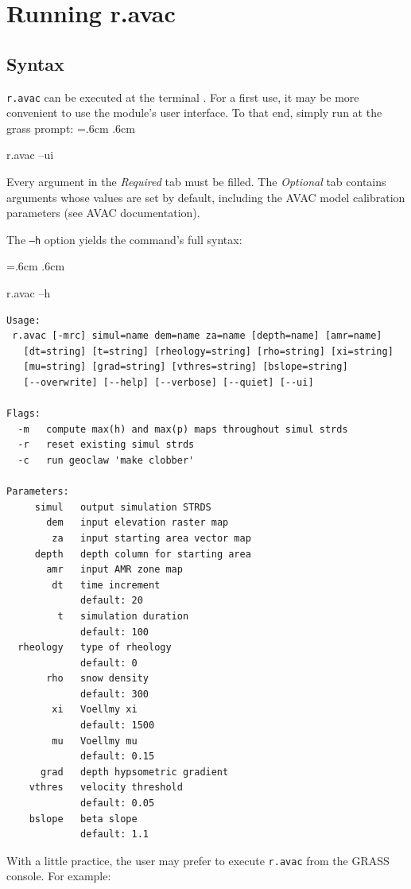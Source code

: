 \documentclass[12pt,oneside]{paper}
\newenvironment{code}{%
\vspace{2mm}%
\hangindent=.6cm%
\parindent.6cm%
\ttfamily%
\color{gris.3}%
}{
\vspace{2mm}%
}
\begin{document}
\section{Running r.avac}

\subsection{Syntax}

\verb+r.avac+ can be executed at the terminal . For a first use, it may be more convenient to use the module's user interface. To that end, simply run at the grass prompt:
\begin{code}
r.avac --ui
\end{code}

Every argument in the \emph{Required} tab must be filled. The \emph{Optional} tab contains arguments whose values are set by default, including the AVAC model calibration parameters (see AVAC documentation).


The \texttt{--h} option yields the command's full syntax:

\begin{code}
r.avac --h
\begin{Verbatim}
Usage:
 r.avac [-mrc] simul=name dem=name za=name [depth=name] [amr=name]
   [dt=string] [t=string] [rheology=string] [rho=string] [xi=string]
   [mu=string] [grad=string] [vthres=string] [bslope=string]
   [--overwrite] [--help] [--verbose] [--quiet] [--ui]

Flags:
  -m   compute max(h) and max(p) maps throughout simul strds
  -r   reset existing simul strds
  -c   run geoclaw 'make clobber'

Parameters:
     simul   output simulation STRDS
       dem   input elevation raster map
        za   input starting area vector map
     depth   depth column for starting area
       amr   input AMR zone map
        dt   time increment
             default: 20
         t   simulation duration
             default: 100
  rheology   type of rheology
             default: 0
       rho   snow density
             default: 300
        xi   Voellmy xi
             default: 1500
        mu   Voellmy mu
             default: 0.15
      grad   depth hypsometric gradient
    vthres   velocity threshold
             default: 0.05
    bslope   beta slope
             default: 1.1
\end{Verbatim}
\end{code}

With a little practice, the user may prefer to execute \verb+r.avac+ from the GRASS console. For example:
\end{document}
